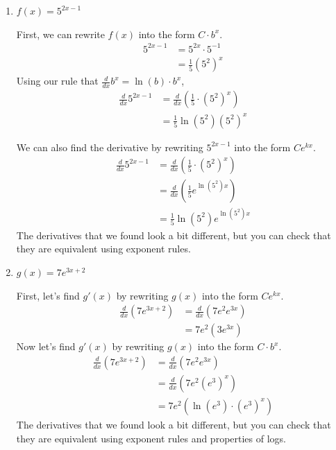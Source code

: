 \documentclass{article}
\begin{document}
\begin{enumerate}[resume]
  \begin{enumerate}
  \item
    \begin{problem}[\vfill]
      $f(x) = 5^{2x - 1}$
    \end{problem}

    \begin{solution}
      First, we can rewrite $f(x)$ into the form $C \cdot b^x$.
      \begin{align*}
        5^{2x-1} &= 5^{2x} \cdot 5^{-1} \\
        &= \tfrac{1}{5} (5^2)^x
      \end{align*}
      Using our rule that $\frac{d}{dx} b^x = \ln(b) \cdot b^x$,
      \begin{align*}
        \tfrac{d}{dx} 5^{2x-1} &= 
        \tfrac{d}{dx}\! \left(\tfrac{1}{5}\cdot (5^2)^x\right) \\
        &= \tfrac{1}{5} \ln(5^2)(5^2)^x
      \end{align*}

      We can also find the derivative by rewriting
      $5^{2x-1}$ into the form $Ce^{kx}$.
      \begin{align*}
           \tfrac{d}{dx} 5^{2x-1} &= 
           \tfrac{d}{dx}\!\left(\tfrac{1}{5} \cdot (5^2)^x\right) \\
           &=\tfrac{d}{dx}\!\left( \tfrac{1}{5} e^{\ln(5^2)x}\right) \\
           &= \tfrac{1}{5}\ln(5^2)e^{\ln(5^2)x}
      \end{align*}
      The derivatives that we found look a bit different, but
      you can check that they are equivalent using exponent rules.
    \end{solution}

  \item
    \begin{problem}[\vfill]
      $g(x) = 7 e^{3x + 2}$
    \end{problem}

    \begin{solution}
      First, let's find $g'(x)$ by rewriting $g(x)$ into the form 
      $Ce^{kx}$.
      \begin{align*}
          \tfrac{d}{dx}\! \left(7e^{3x+2}\right) &= 
          \tfrac{d}{dx}\! \left(7e^2e^{3x}\right) \\
          &= 7e^2(3e^{3x})
      \end{align*}
      Now let's find $g'(x)$ by rewriting $g(x)$ into the form
      $C\cdot b^x$.
      \begin{align*}
        \tfrac{d}{dx}\! \left(7e^{3x+2}\right) &= 
          \tfrac{d}{dx}\! \left(7e^2e^{3x}\right) \\
          &= \tfrac{d}{dx}\! \left(7e^2(e^3)^x\right) \\
          &= 7e^2\left(\ln(e^3)\cdot (e^3)^x\right)
      \end{align*}
      The derivatives that we found look a bit different, but
      you can check that they are equivalent using exponent rules
      and properties of logs.
    \end{solution}


\end{enumerate}
\end{enumerate}
\end{document}
